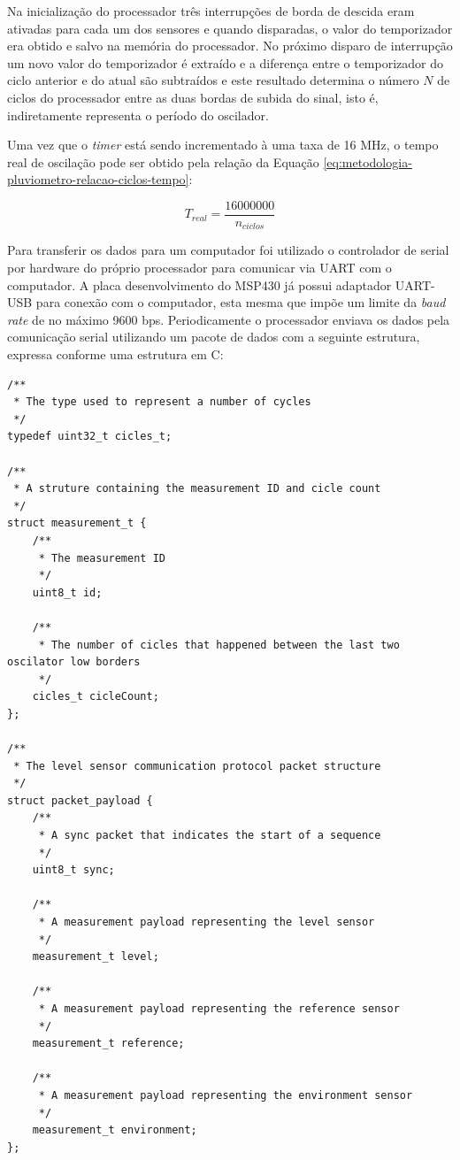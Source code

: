 \documentclass[a4paper]{instrumentacao}
\begin{document}
Na inicialização do processador três interrupções de borda de descida eram ativadas para cada um dos sensores e quando disparadas, o valor do temporizador era obtido e salvo na memória do processador. No próximo disparo de interrupção um novo valor do temporizador é extraído e a diferença entre o temporizador do ciclo anterior e do atual são subtraídos e este resultado determina o número $N$ de ciclos do processador entre as duas bordas de subida do sinal, isto é, indiretamente representa o período do oscilador.

Uma vez que o \textit{timer} está sendo incrementado à uma taxa de 16 MHz, o tempo real de oscilação pode ser obtido pela relação da Equação \ref{eq:metodologia-pluviometro-relacao-ciclos-tempo}:

\begin{equation}
	T_{real} = \frac{16 000 000}{n_{ciclos}}
	\label{eq:metodologia-pluviometro-relacao-ciclos-tempo}
\end{equation}

Para transferir os dados para um computador foi utilizado o controlador de serial por hardware do próprio processador para comunicar via UART com o computador. A placa desenvolvimento do MSP430 já possui adaptador UART-USB para conexão com o computador, esta mesma que impõe um limite da \textit{baud rate} de no máximo 9600 bps. Periodicamente o processador enviava os dados pela comunicação serial utilizando um pacote de dados com a seguinte estrutura, expressa conforme uma estrutura em C:

\begin{lstlisting}[caption=Estrutura dos pacotes de conteúdo enviados pela linha de comunicação serial]
/**
 * The type used to represent a number of cycles
 */
typedef uint32_t cicles_t;

/**
 * A struture containing the measurement ID and cicle count
 */
struct measurement_t {
    /**
     * The measurement ID
     */
    uint8_t id;

    /**
     * The number of cicles that happened between the last two oscilator low borders
     */
    cicles_t cicleCount;
};

/**
 * The level sensor communication protocol packet structure
 */
struct packet_payload {
    /**
     * A sync packet that indicates the start of a sequence
     */
    uint8_t sync;

    /**
     * A measurement payload representing the level sensor
     */
    measurement_t level;

    /**
     * A measurement payload representing the reference sensor
     */
	measurement_t reference;

    /**
     * A measurement payload representing the environment sensor
     */
    measurement_t environment;
};
\end{lstlisting}
\end{document}
